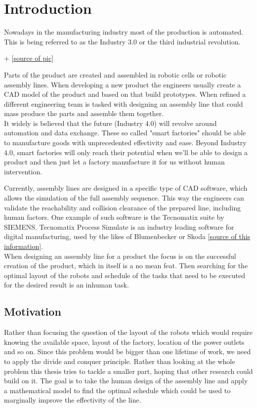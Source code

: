 \chapter{Introduction}
Nowadays in the manufacturing industry most of the production is automated. This is being referred to as the Industry 3.0 or the third industrial revolution. 

	 + \ref{source of pic}
	
 Parts of the product are created and assembled in robotic cells or robotic assembly lines. When developing a new product the engineers usually create a CAD model of the product and based on that build prototypes. When refined a different engineering team is tasked with designing an assembly line that could mass produce the parts and assemble them together. \\
 
It widely is believed that the future (Industry 4.0) will revolve around automation and data exchange. These so called "smart factories" should be able to manufacture goods with unprecedented effectivity and ease. Beyond Industry 4.0, smart factories will only reach their potential when we'll be able to design a product and then just let a factory manufacture it for us without human intervention.   

Currently, assembly lines are designed in a specific type of CAD software, which allows the simulation of the full assembly sequence. This way the engineers can validate the reachability and collision clearance of the prepared line, including human factors. One example of such software is the Tecnomatix suite by SIEMENS. Tecnomatix Process Simulate is an industry leading software for digital manufacturing, used by the likes of Blumenbecker or Skoda \ref{source of this information}. \\ 

When designing an assembly line for a product the focus is on the successful creation of the product, which in itself is a no mean feat. Then searching for the optimal layout of the robots and schedule of the tasks that need to be executed for the desired result is an inhuman task. 

\section{Motivation}

Rather than focusing the question of the layout of the robots which would require knowing the available space, layout of the factory, location of the power outlets and so on. Since this problem would be bigger than one lifetime of work, we need to apply the divide and conquer principle. Rather than looking at the whole problem this thesis tries to tackle a smaller part, hoping that other research could build on it. The goal is to take the human design of the assembly line and apply a mathematical model to find the optimal schedule which could be used to marginally improve the effectivity of the line. \\

